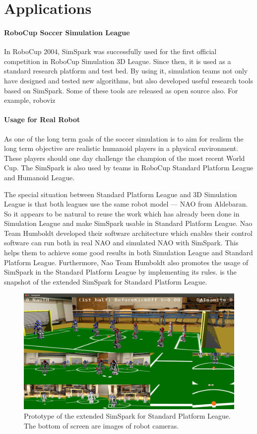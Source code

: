 \documentclass{llncs}
\begin{document}
\section{Applications}

\paragraph{RoboCup Soccer Simulation League}
In RoboCup 2004, SimSpark was successfully used for the first official competition in RoboCup Simulation 3D League. Since then, it is used as a standard research platform and test bed. By using it, simulation teams not only have designed and tested new algorithms, but also developed useful research tools based on SimSpark. Some of these tools are released as open source also. For example, roboviz

\paragraph{Usage for Real Robot}
As one of the long term goals of the soccer simulation is to aim for realism the long term objective are realistic humanoid players in a physical environment.
These players should one day challenge the champion of the most recent World Cup.
The SimSpark is also used by teams in RoboCup Standard Platform League and Humanoid League.

The special situation between Standard Platform League and 3D Simulation League is that both leagues use the same robot model — NAO from Aldebaran.
So it appears to be natural to reuse the work which has already been done in Simulation League and make SimSpark usable in Standard Platform League.
Nao Team Humboldt developed their software architecture\cite{SCPR2010} which enables their control software can run both in real NAO and simulated NAO with SimSpark. This helps them to achieve some good results in both Simulation League and Standard Platform League.
Furthermore, Nao Team Humboldt also promotes the usage of SimSpark in the Standard Platform League by implementing its rules.  is the snapshot of the extended SimSpark for Standard Platform League.

\begin{figure}
  \centering
  \includegraphics[width = 0.75\columnwidth]{simspark-spl}
  \caption{Prototype of the extended SimSpark for Standard Platform League.
    The bottom of screen are images of robot cameras.}
  \label{f:simspark-spl}
\end{figure}
\end{document}
